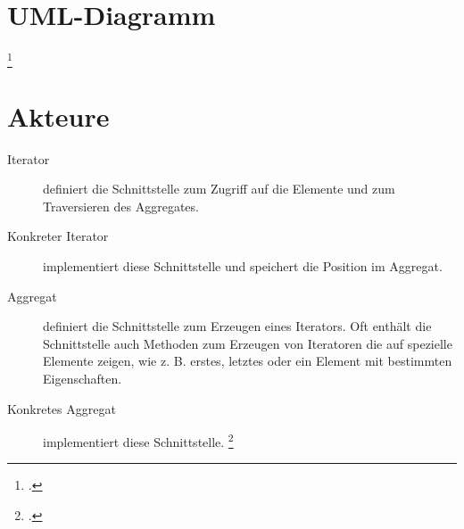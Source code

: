 \documentclass{lehramt-informatik-haupt}
\begin{document}
\section{UML-Diagramm}

\footcite{wiki:iterator}

%

\section{Akteure}

\begin{description}
\item[Iterator] definiert die Schnittstelle zum Zugriff auf die Elemente
und zum Traversieren des Aggregates.

\item[Konkreter Iterator] implementiert diese Schnittstelle und
speichert die Position im Aggregat.

\item[Aggregat] definiert die Schnittstelle zum Erzeugen eines
Iterators. Oft enthält die Schnittstelle auch Methoden zum Erzeugen von
Iteratoren die auf spezielle Elemente zeigen, wie z. B. erstes, letztes
oder ein Element mit bestimmten Eigenschaften.

\item[Konkretes Aggregat] implementiert diese Schnittstelle.
\footcite{wiki:iterator}
\end{description}
\end{document}
